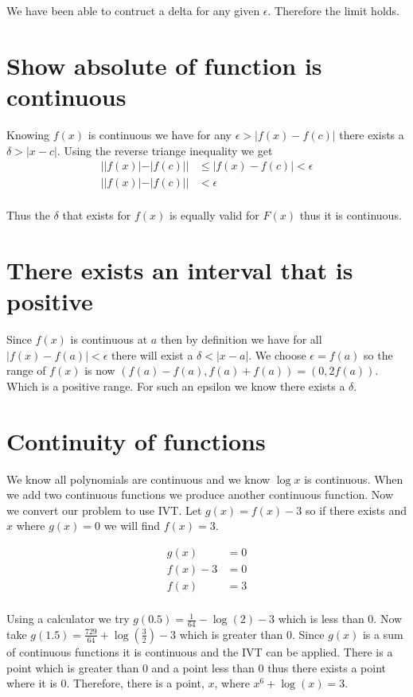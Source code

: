 \documentclass{article}
\begin{document}
We have been able to contruct a delta for any given $\epsilon$. Therefore
the limit holds.

\section{Show absolute of function is continuous}
Knowing $f(x)$ is continuous we have for any $\epsilon > |f(x) - f(c)|$ there
exists a $\delta > |x - c|$. Using the reverse triange inequality we get
\begin{align*}
    ||f(x)| - |f(c)|| &\leq |f(x) - f(c)| < \epsilon \\
    ||f(x)| - |f(c)|| &< \epsilon \\
\end{align*}

Thus the $\delta$ that exists for $f(x)$ is equally valid for $F(x)$ thus it is
continuous.

\section{There exists an interval that is positive}
Since $f(x)$ is continuous at $a$ then by definition we have for all
$|f(x) - f(a)| < \epsilon$ there will exist a $\delta < |x-a|$. We choose
$\epsilon = f(a)$ so the range of $f(x)$ is now $(f(a) - f(a), f(a) + f(a))
= (0, 2f(a))$. Which is a positive range. For such an epsilon we know there
exists a $\delta$.

\section{Continuity of functions}
We know all polynomials are continuous and we know $\log x$ is continuous.
When we add two continuous functions we produce another continuous function.
Now we convert our problem to use IVT. Let $g(x) = f(x) - 3$ so if there exists
and $x$ where $g(x) = 0$ we will find $f(x) = 3$.

\begin{align*}
    g(x) &= 0 \\
    f(x) - 3 &= 0 \\
    f(x) &= 3 \\
\end{align*}

Using a calculator we try $g(0.5) = \frac{1}{64} - \log(2) - 3$ which is less
than 0. Now take $g(1.5) = \frac{729}{64} + \log\left(\frac{3}{2}\right) - 3$
which is greater than 0. Since $g(x)$ is a sum of continuous functions it is
continuous and the IVT can be applied. There is a point which is greater than 0
and a point less than 0 thus there exists a point where it is 0. Therefore,
there is a point, $x$, where $x^6 + \log(x) = 3$.
\end{document}
